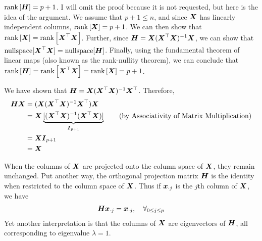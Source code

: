 \documentclass[12pt]{article}
\begin{document}

\begin{enumerate}


$\rank{\H}=p+1$. I will omit the proof because it is not requested,
but here is the idea of the argument. We assume that $p + 1 \leq n$,
and since $\X$ has linearly independent columns, $\rank{\X}=p+1$.
We can then show that  $\rank{\X}=\rank{\X^\top \X}$. Further, since
$\H=\X(\X^\top \X)^{-1}\X$, we can show that
$\text{nullspace}[\X^\top\X] = \text{nullspace}[\H]$. Finally, using the fundamental
theorem of linear maps (also known as the rank-nullity theorem), we can conclude
that $\rank{\H} = \rank{\X^\top \X}=\rank{\X} = p + 1$.



We have shown that $\H=\X(\X^\top\X)^{-1}\X^\top$. Therefore,
\begin{align*}
	\H\X &= (\X(\X^\top \X)^{-1}\X^\top)\X\\
	&=\X\underbrace{[(\X^\top \X)^{-1}(\X^\top \X)]}_{\I_{p+1}}
	\tag{by Associativity of Matrix Multiplication}\\
	&=\X \I_{p+1}\\
	&=\X
\end{align*}


When the columns of $\X$ are projected onto the column space of $\X$, they remain
unchanged. Put another way, the orthogonal projection matrix $\H$ is the identity
when restricted to the column space of $\X$. Thus if $\x_{\cdot j}$ is the $j$th column
of $\X$, we have
\begin{align*}
	\H\x_{\cdot j}=\x_{\cdot j},\quad \forall_{0\leq j\leq p}
\end{align*}
Yet another interpretation is that the
columns of $\X$ are eigenvectors of $\H$, all corresponding to eigenvalue $\lambda=1$.



\end{enumerate}
\end{document}
